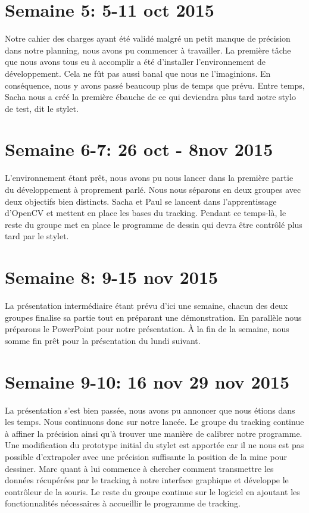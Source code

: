\documentclass[11pt,a4paper,oldfontcommands]{memoir}
\begin{document}
\section{Semaine 5: 5-11 oct 2015}

Notre cahier des charges ayant été validé malgré un petit manque de précision dans notre planning, nous avons pu commencer à travailler. La première tâche que nous avons tous eu à accomplir a été d'installer l'environnement de développement. Cela ne fût pas aussi banal que nous ne l'imaginions. En conséquence, nous y avons passé beaucoup plus de temps que prévu. Entre temps, Sacha nous a créé la première ébauche de ce qui deviendra plus tard notre stylo de test, dit le stylet.

\section{Semaine 6-7: 26 oct - 8nov 2015}

L'environnement étant prêt, nous avons pu nous lancer dans la première partie du développement à proprement parlé. Nous nous séparons en deux groupes avec deux objectifs bien distincts. Sacha et Paul se lancent dans l'apprentissage d'OpenCV et mettent en place les bases du tracking. Pendant ce temps-là, le reste du groupe met en place le programme de dessin qui devra être contrôlé plus tard par le stylet.

\section{Semaine 8: 9-15 nov 2015}

La présentation intermédiaire étant prévu d'ici une semaine, chacun des deux groupes finalise sa partie tout en préparant une démonstration. En parallèle nous préparons le PowerPoint pour notre présentation. À la fin de la semaine, nous somme fin prêt pour la présentation du lundi suivant.

\section{Semaine 9-10: 16 nov 29 nov 2015}

La présentation s'est bien passée, nous avons pu annoncer que nous étions dans les temps. Nous continuons donc sur notre lancée. Le groupe du tracking continue à affiner la précision ainsi qu'à trouver une manière de calibrer notre programme. Une modification du prototype initial du stylet est apportée car il ne nous est pas possible d'extrapoler avec une précision suffisante la position de la mine pour dessiner. Marc quant à lui commence à chercher comment transmettre les données récupérées par le tracking à notre interface graphique et développe le contrôleur de la souris. Le reste du groupe continue sur le logiciel en ajoutant les fonctionnalités nécessaires à accueillir le programme de tracking.
\end{document}
